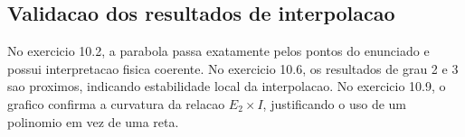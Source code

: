 \documentclass[../main.tex]{subfiles}
\begin{document}
\subsection{Validacao dos resultados de interpolacao}

No exercicio 10.2, a parabola passa exatamente pelos pontos do enunciado e
possui interpretacao fisica coerente. No exercicio 10.6, os resultados de grau
2 e 3 sao proximos, indicando estabilidade local da interpolacao. No exercicio
10.9, o grafico confirma a curvatura da relacao \(E_2 \times I\), justificando
o uso de um polinomio em vez de uma reta.
\end{document}
